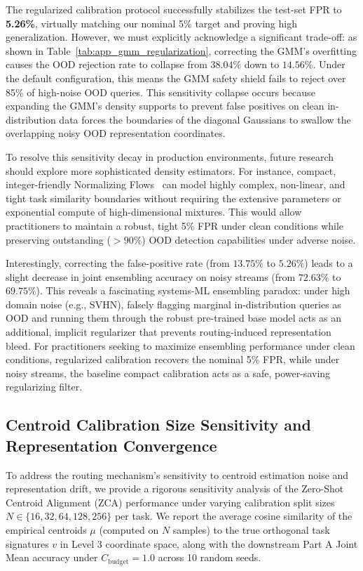 \documentclass{article}
\theoremstyle{plain}
\theoremstyle{definition}
\theoremstyle{remark}
\begin{document}
The regularized calibration protocol successfully stabilizes the test-set FPR to \textbf{5.26\%}, virtually matching our nominal 5\% target and proving high generalization. However, we must explicitly acknowledge a significant trade-off: as shown in Table~\ref{tab:app_gmm_regularization}, correcting the GMM's overfitting causes the OOD rejection rate to collapse from $38.04\%$ down to $14.56\%$. Under the default configuration, this means the GMM safety shield fails to reject over 85\% of high-noise OOD queries. This sensitivity collapse occurs because expanding the GMM's density supports to prevent false positives on clean in-distribution data forces the boundaries of the diagonal Gaussians to swallow the overlapping noisy OOD representation coordinates.

To resolve this sensitivity decay in production environments, future research should explore more sophisticated density estimators. For instance, compact, integer-friendly Normalizing Flows~\citep{papamakarios2021normalizing} can model highly complex, non-linear, and tight task similarity boundaries without requiring the extensive parameters or exponential compute of high-dimensional mixtures. This would allow practitioners to maintain a robust, tight 5\% FPR under clean conditions while preserving outstanding ($>90\%$) OOD detection capabilities under adverse noise.

Interestingly, correcting the false-positive rate (from $13.75\%$ to $5.26\%$) leads to a slight decrease in joint ensembling accuracy on noisy streams (from $72.63\%$ to $69.75\%$). This reveals a fascinating systems-ML ensembling paradox: under high domain noise (e.g., SVHN), falsely flagging marginal in-distribution queries as OOD and running them through the robust pre-trained base model acts as an additional, implicit regularizer that prevents routing-induced representation bleed. For practitioners seeking to maximize ensembling performance under clean conditions, regularized calibration recovers the nominal 5\% FPR, while under noisy streams, the baseline compact calibration acts as a safe, power-saving regularizing filter.

\subsection{Centroid Calibration Size Sensitivity and Representation Convergence}
To address the routing mechanism's sensitivity to centroid estimation noise and representation drift, we provide a rigorous sensitivity analysis of the Zero-Shot Centroid Alignment (ZCA) performance under varying calibration split sizes $N \in \{16, 32, 64, 128, 256\}$ per task. We report the average cosine similarity of the empirical centroids $\mu$ (computed on $N$ samples) to the true orthogonal task signatures $v$ in Level 3 coordinate space, along with the downstream Part A Joint Mean accuracy under $C_{\text{budget}} = 1.0$ across 10 random seeds.
\end{document}

